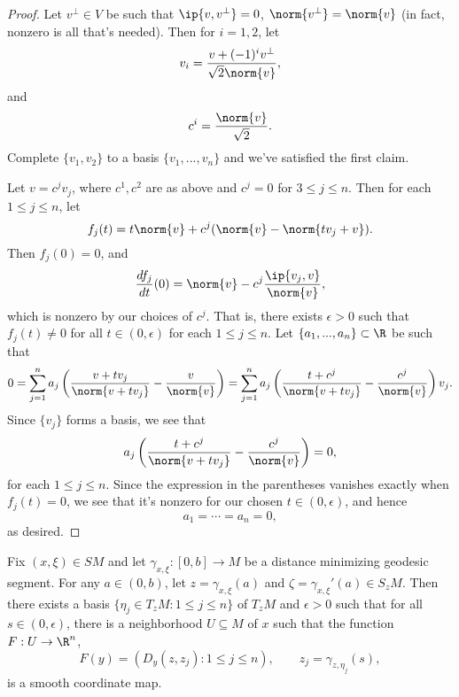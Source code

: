 \begin{proof}
Let $v^\perp\in V$ be such that $\ip{v,v^\perp}=0$, $\norm{v^\perp}=\norm{v}$ (in fact, nonzero is all that's needed).  Then for $i=1,2$, let
$$v_i=\frac{v+(-1)^iv^\perp}{\sqrt{2}\norm{v}},$$
and
$$c^i=\frac{\norm{v}}{\sqrt{2}}.$$
Complete $\{v_1,v_2\}$ to a basis $\{v_1,...,v_n\}$ and we've satisfied the first claim.

Let $v=c^jv_j$, where $c^1,c^2$ are as above and $c^j=0$ for $3\leq j\leq n$.  Then for each $1\leq j\leq n$, let
$$f_j(t)=t\norm{v}+c^j(\norm{v}-\norm{tv_j+v}).$$
Then $f_j(0)=0$, and
$$\frac{df_j}{dt}(0)=\norm{v}-c^j\frac{\ip{v_j,v}}{\norm{v}},$$
which is nonzero by our choices of $c^j$.  That is, there exists $\epsilon>0$ such that $f_j(t)\neq0$ for all $t\in (0,\epsilon)$ for each $1\leq j\leq n$.  Let $\{a_1,...,a_n\}\subset\R$ be such that
$$0=\sum_{j=1}^na_j\left(\frac{v+tv_j}{\norm{v+tv_j}}-\frac{v}{\norm{v}}\right)=\sum_{j=1}^na_j\left(\frac{t+c^j}{\norm{v+tv_j}}-\frac{c^j}{\norm{v}}\right)v_j.$$
Since $\{v_j\}$ forms a basis, we see that
$$a_j\left(\frac{t+c^j}{\norm{v+tv_j}}-\frac{c^j}{\norm{v}}\right)=0,$$
for each $1\leq j\leq n$.  Since the expression in the parentheses vanishes exactly when $f_j(t)=0$, we see that it's nonzero for our chosen $t\in(0,\epsilon)$, and hence
$$a_1=\cdots=a_n=0,$$
as desired.
\end{proof}

\begin{prop}
    Fix $(x,\xi)\in SM$ and let $\gamma_{x,\xi}:[0,b]\to M$ be a distance minimizing geodesic segment.  For any $a\in(0,b)$, let $z=\gamma_{x,\xi}(a)$ and $\zeta=\gamma_{x,\xi}'(a)\in S_zM$.  Then there exists a basis $\{\eta_j\in T_zM:1\leq j\leq n\}$ of $T_zM$ and $\epsilon>0$ such that for all $s\in (0,\epsilon)$, there is a neighborhood $U\subseteq M$ of $x$ such that the function $F:U\to\R^n$,
    $$F(y)=(D_y(z,z_j):1\leq j\leq n),\qquad z_j=\gamma_{z,\eta_j}(s),$$
    is a smooth coordinate map.
\end{prop}

